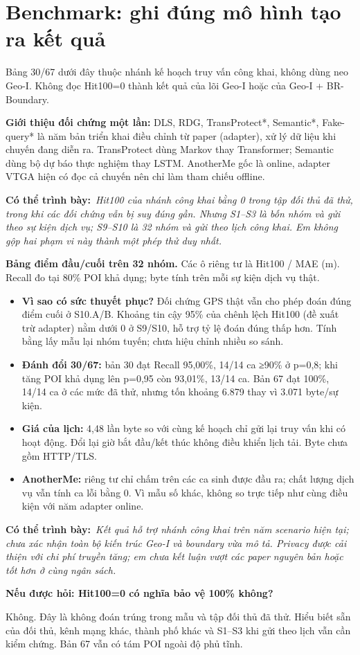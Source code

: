 \documentclass[10pt,a4paper]{article}
\newcommand{\key}[1]{\par\smallskip\noindent\colorbox{pale}{\parbox{\dimexpr\linewidth-2\fboxsep}{#1}}\par\smallskip}
\newcommand{\say}[1]{\par\textbf{Có thể trình bày:}\ \textit{#1}\par}
\newcommand{\ask}[2]{\par\textbf{Nếu được hỏi: #1}\par #2\par}
\begin{document}
\clearpage\section{Benchmark: ghi đúng mô hình tạo ra kết quả}
\key{Bảng 30/67 dưới đây thuộc nhánh kế hoạch truy vấn công khai, không dùng neo Geo-I. Không đọc Hit100=0 thành kết quả của lõi Geo-I hoặc của Geo-I + BR-Boundary.}
\textbf{Giới thiệu đối chứng một lần:} DLS, RDG, TransProtect*, Semantic*, Fake-query* là năm bản triển khai điều chỉnh từ paper (adapter), xử lý dữ liệu khi chuyến đang diễn ra. TransProtect dùng Markov thay Transformer; Semantic dùng bộ dự báo thực nghiệm thay LSTM. AnotherMe gốc là online, adapter VTGA hiện có đọc cả chuyến nên chỉ làm tham chiếu offline.
\PrivacyEvidence
\say{Hit100 của nhánh công khai bằng 0 trong tập đối thủ đã thử, trong khi các đối chứng vẫn bị suy đúng gần. Nhưng S1–S3 là bốn nhóm và gửi theo sự kiện dịch vụ; S9–S10 là 32 nhóm và gửi theo lịch công khai. Em không gộp hai phạm vi này thành một phép thử duy nhất.}

\textbf{Bảng điểm đầu/cuối trên 32 nhóm.} Các ô riêng tư là Hit100 / MAE (m). Recall đo tại 80\% POI khả dụng; byte tính trên mỗi sự kiện dịch vụ thật.
\EndpointEvidence
\begin{itemize}
\item \textbf{Vì sao có sức thuyết phục?} Đối chứng GPS thật vẫn cho phép đoán đúng điểm cuối ở S10.A/B. Khoảng tin cậy 95\% của chênh lệch Hit100 (đề xuất trừ adapter) nằm dưới 0 ở S9/S10, hỗ trợ tỷ lệ đoán đúng thấp hơn. Tính bằng lấy mẫu lại nhóm tuyến; chưa hiệu chỉnh nhiều so sánh.
\item \textbf{Đánh đổi 30/67:} bản 30 đạt Recall 95,00\%, 14/14 ca ≥90\% ở p=0,8; khi tăng POI khả dụng lên p=0,95 còn 93,01\%, 13/14 ca. Bản 67 đạt 100\%, 14/14 ca ở các mức đã thử, nhưng tốn khoảng 6.879 thay vì 3.071 byte/sự kiện.
\item \textbf{Giá của lịch:} 4,48 lần byte so với cùng kế hoạch chỉ gửi lại truy vấn khi có hoạt động. Đổi lại giờ bắt đầu/kết thúc không điều khiển lịch tải. Byte chưa gồm HTTP/TLS.
\item \textbf{AnotherMe:} riêng tư chỉ chấm trên các ca sinh được đầu ra; chất lượng dịch vụ vẫn tính ca lỗi bằng 0. Vì mẫu số khác, không so trực tiếp như cùng điều kiện với năm adapter online.
\end{itemize}
\say{Kết quả hỗ trợ nhánh công khai trên năm scenario hiện tại; chưa xác nhận toàn bộ kiến trúc Geo-I và boundary vừa mô tả. Privacy được cải thiện với chi phí truyền tăng; em chưa kết luận vượt các paper nguyên bản hoặc tốt hơn ở cùng ngân sách.}
\ask{Hit100=0 có nghĩa bảo vệ 100\% không?}{Không. Đây là không đoán trúng trong mẫu và tập đối thủ đã thử. Hiểu biết sẵn của đối thủ, kênh mạng khác, thành phố khác và S1–S3 khi gửi theo lịch vẫn cần kiểm chứng. Bản 67 vẫn có tám POI ngoài độ phủ tĩnh.}

\clearpage

\end{document}
